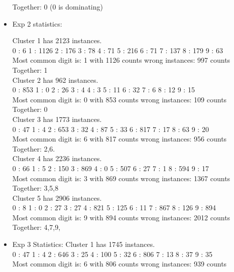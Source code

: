 \documentclass[paper=a4, fontsize=11pt]{scrartcl} %
\numberwithin{equation}{section} %
\numberwithin{figure}{section} %
\numberwithin{table}{section} %
\begin{document}
\begin{itemize}
Together: 0 (0 is dominating)\\

\item Exp 2 statistics:

Cluster 1 has 2123 instances. \\
0 : 6	1 : 1126	2 : 176	3 : 78	4 : 71	5 : 216	6 : 71	7 : 137	8 : 179	9 : 63	\\
Most common digit is: 1 with 1126 counts	wrong instances: 997 counts\\

Together: 1\\

Cluster 2 has 962 instances. \\
0 : 853	1 : 0	2 : 26	3 : 4	4 : 3	5 : 11	6 : 32	7 : 6	8 : 12	9 : 15	\\
Most common digit is: 0 with 853 counts	wrong instances: 109 counts\\

Together: 0\\

Cluster 3 has 1773 instances. \\
0 : 47	1 : 4	2 : 653	3 : 32	4 : 87	5 : 33	6 : 817	7 : 17	8 : 63	9 : 20	\\
Most common digit is: 6 with 817 counts	wrong instances: 956 counts\\

Together: 2,6.\\

Cluster 4 has 2236 instances. \\
0 : 66	1 : 5	2 : 150	3 : 869	4 : 0	5 : 507	6 : 27	7 : 1	8 : 594	9 : 17	\\
Most common digit is: 3 with 869 counts	wrong instances: 1367 counts\\

Together: 3,5,8\\

Cluster 5 has 2906 instances. \\
0 : 8	1 : 0	2 : 27	3 : 27	4 : 821	5 : 125	6 : 11	7 : 867	8 : 126	9 : 894	\\
Most common digit is: 9 with 894 counts	wrong instances: 2012 counts\\

Together: 4,7,9,\\

\item Exp 3 Statistics: 
Cluster 1 has 1745 instances. \\
0 : 47	1 : 4	2 : 646	3 : 25	4 : 100	5 : 32	6 : 806	7 : 13	8 : 37	9 : 35	\\
Most common digit is: 6 with 806 counts	wrong instances: 939 counts\\


\end{itemize}
\end{document}
